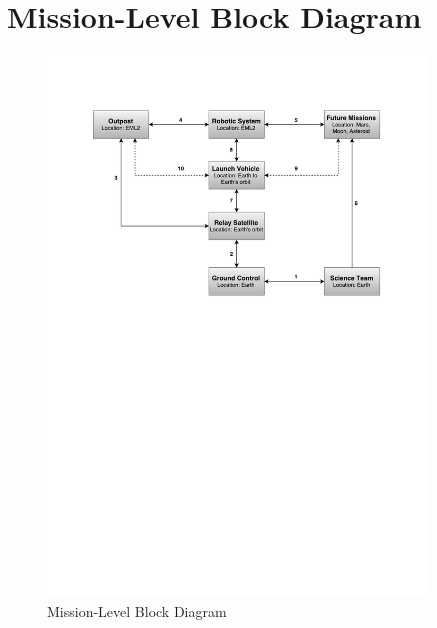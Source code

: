 \documentclass[12pt, letter]{article}
\begin{document}
\section{Mission-Level Block Diagram}
\label{MLBD}
\begin{figure}[H]
\label{MLBD_fig}
\centering
\includegraphics[width=0.9\textwidth]{missionlevel}
\caption{Mission-Level Block Diagram}
\end{figure}
\end{document}
